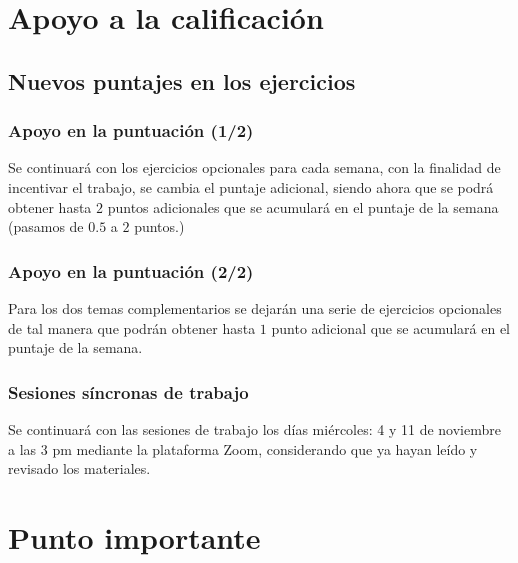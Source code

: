 \section{Apoyo a la calificación}
\subsection{Nuevos puntajes en los ejercicios}
\begin{frame}
\frametitle{Apoyo en la puntuación (1/2)}
Se continuará con los ejercicios opcionales para cada semana, con la finalidad de incentivar el trabajo, se cambia el puntaje adicional, siendo ahora que se podrá obtener hasta $2$ puntos adicionales que se acumulará en el puntaje de la semana (pasamos de $0.5$ a $2$ puntos.)
\end{frame}
\begin{frame}
\frametitle{Apoyo en la puntuación (2/2)}
Para los dos temas complementarios se dejarán una serie de ejercicios opcionales de tal manera que podrán obtener hasta $1$ punto adicional que se acumulará en el puntaje de la semana.
\end{frame}
\begin{frame}
\frametitle{Sesiones síncronas de trabajo}
Se continuará con las sesiones de trabajo los días miércoles: 4 y 11 de noviembre a las 3 pm mediante la plataforma Zoom, considerando que ya hayan leído y revisado los materiales.
\end{frame}
\section{Punto importante}
